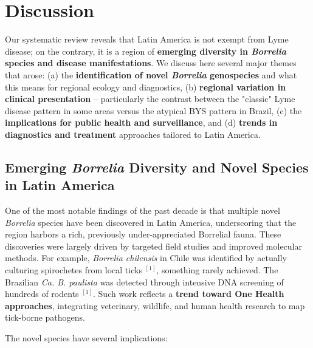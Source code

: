 \documentclass[11pt,letterpaper]{article}
\newcommand{\mycite}[1]{$^{[#1]}$}
\begin{document}
\section{Discussion}
Our systematic review reveals that Latin America is not exempt from Lyme disease; on the contrary, it is a region of \textbf{emerging diversity in \textit{Borrelia} species and disease manifestations}. We discuss here several major themes that arose: (a) the \textbf{identification of novel \textit{Borrelia} genospecies} and what this means for regional ecology and diagnostics, (b) \textbf{regional variation in clinical presentation} – particularly the contrast between the "classic" Lyme disease pattern in some areas versus the atypical BYS pattern in Brazil, (c) the \textbf{implications for public health and surveillance}, and (d) \textbf{trends in diagnostics and treatment} approaches tailored to Latin America.

\subsection{Emerging \textit{Borrelia} Diversity and Novel Species in Latin America}
One of the most notable findings of the past decade is that multiple novel \textit{Borrelia} species have been discovered in Latin America, underscoring that the region harbors a rich, previously under-appreciated Borrelial fauna. These discoveries were largely driven by targeted field studies and improved molecular methods. For example, \textit{Borrelia chilensis} in Chile was identified by actually culturing spirochetes from local ticks \mycite{1}, something rarely achieved. The Brazilian \textit{Ca. B. paulista} was detected through intensive DNA screening of hundreds of rodents \mycite{1}. Such work reflects a \textbf{trend toward One Health approaches}, integrating veterinary, wildlife, and human health research to map tick-borne pathogens.

The novel species have several implications:
\end{document}
